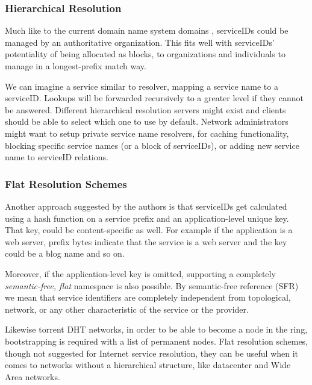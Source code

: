 \subsubsection{Hierarchical Resolution}
\label{sec:hierresol}
Much like to the current domain name system domains , serviceIDs could be managed by an authoritative organization.
This fits well with serviceIDs' potentiality of being allocated as blocks, to organizations and individuals to manage in a longest-prefix match way.

We can imagine a service similar to resolver, mapping a service name to a serviceID.
Lookups will be forwarded recursively to a greater level if they cannot be answered.
Different hierarchical resolution servers might exist and clients should be able to select which one to use by default.
Network administrators might want to setup private service name resolvers, for caching functionality, blocking specific service names (or a block of serviceIDs), or adding new service name to serviceID relations.



\subsubsection{Flat Resolution Schemes}
Another approach suggested by the authors is that serviceIDs get calculated using a hash function on a service prefix and an application-level unique key.
That key, could be content-specific as well.
For example if the application is a web server, prefix bytes indicate that the service is a web server and the key could be a blog name and so on.

Moreover, if the application-level key is omitted, supporting a completely \emph{semantic-free, flat} namespace is also possible.
By semantic-free\cite{Walfisha2004} reference (SFR) we mean that service identifiers are completely independent from topological, network, or any other characteristic of the service or the provider.

Likewise torrent DHT networks, in order to be able to become a node in the ring, bootstrapping is required with a list of permanent nodes.
Flat resolution schemes, though not suggested for Internet service resolution, they can be useful when it comes to networks without a hierarchical structure, like datacenter and Wide Area networks.
